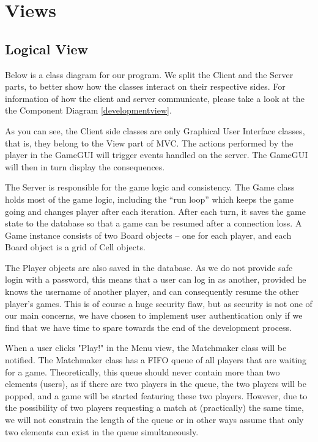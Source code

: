\section{Views}


\subsection{Logical View}
\label{logicalview}

Below is a class diagram for our program. We split the Client and the Server parts, to better show how the classes interact on their respective sides. For information of how the client and server communicate, please take a look at the the Component Diagram \ref{developmentview}.

As you can see, the Client side classes are only Graphical User Interface classes, that is, they belong to the View part of MVC. The actions performed by the player in the GameGUI will trigger events handled on the server. The GameGUI will then in turn display the consequences.

The Server is responsible for the game logic and consistency. The Game class holds most of the game logic, including the ``run loop'' which keeps the game going and changes player after each iteration. After each turn, it saves the game state to the database so that a game can be resumed after a connection loss. A Game instance consists of two Board objects -- one for each player, and each Board object is a grid of Cell objects.

The Player objects are also saved in the database. As we do not provide safe login with a password, this means that a user can log in as another, provided he knows the username of another player, and can consequently resume the other player's games. This is of course a huge security flaw, but as security is not one of our main concerns, we have chosen to implement user authentication only if we find that we have time to spare towards the end of the development process.

When a user clicks "Play!" in the Menu view, the Matchmaker class will be notified. The Matchmaker class has a FIFO queue of all players that are waiting for a game. Theoretically, this queue should never contain more than two elements (users), as if there are two players in the queue, the two players will be popped, and a game will be started featuring these two players. However, due to the possibility of two players requesting a match at (practically) the same time, we will not constrain the length of the queue or in other ways assume that only two elements can exist in the queue simultaneously.

